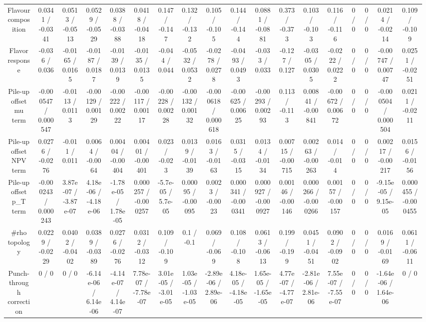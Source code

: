 \documentclass[10pt]{article}
\begin{document}
\begin{table}[htbp]
\begin{center}
\begin{tabular}{|c|c|c|c|c|c|c|c|c|c|c|c|c|c|c|c|c|c|}
  Flavour composition & 0.0341 / -0.0341 & 0.0513 / -0.0513 & 0.0529 / -0.0529 & 0.0388 / -0.0388 & 0.0418 / -0.0418 & 0.147 / -0.147 & 0.132 / -0.132 & 0.105 / -0.105 & 0.144 / -0.144 & 0.0881 / -0.0881 & 0.373 / -0.373 & 0.103 / -0.103 & 0.116 / -0.116 & 0 / 0 & 0 / 0 & 0.0214 / -0.0214 & 0.109 / -0.109 \\ 
  Flavor response & -0.036 / 0.036 & -0.0165 / 0.0165 & -0.0187 / 0.0187 & -0.0139 / 0.0139 & -0.0135 / 0.0135 & -0.044 / 0.044 & -0.0532 / 0.0532 & -0.0278 / 0.0278 & -0.0493 / 0.0493 & -0.033 / 0.033 & -0.127 / 0.127 & -0.0305 / 0.0305 & -0.0222 / 0.0222 & 0 / 0 & 0 / 0 & -0.00747 / 0.00747 & 0.0251 / -0.0251 \\ 
  Pile-up offset mu term & -0.000547 / 0.000547 & -0.0113 / 0.0113 & -0.00129 / 0.00129 & -0.00222 / 0.00222 & -0.00117 / 0.00117 & -0.00228 / 0.00228 & -0.00132 / 0.00132 & -0.000618 / 0.000618 & -0.00625 / 0.00625 & -0.00293 / 0.00293 & 0.113 / -0.113 & 0.00841 / -0.00841 & -0.00672 / 0.00672 & 0 / 0 & 0 / 0 & -0.000504 / 0.000504 & 0.0211 / -0.0211 \\ 
  Pile-up offset NPV term & 0.0276 / -0.0276 & -0.011 / 0.011 & 0.0064 / -0.0064 & 0.00404 / -0.00404 & 0.00401 / -0.00401 & 0.023 / -0.023 & 0.0139 / -0.0139 & 0.0163 / -0.0163 & 0.0315 / -0.0315 & 0.0134 / -0.0134 & 0.00715 / -0.00715 & 0.00263 / -0.00263 & 0.014 / -0.014 & 0 / 0 & 0 / 0 & 0.00217 / -0.00217 & 0.0156 / -0.0156 \\ 
  Pile-up offset p_{T} term & -0.000243 / 0.000243 & 3.87e-07 / -3.87e-07 & 4.18e-06 / -4.18e-06 & -1.78e-05 / 1.78e-05 & 0.000257 / -0.000257 & -5.7e-05 / 5.7e-05 & 0.00095 / -0.00095 & 0.0023 / -0.0023 & 0.000341 / -0.000341 & 0.000927 / -0.000927 & 0.00146 / -0.00146 & 0.000266 / -0.000266 & 0.00157 / -0.00157 & 0 / 0 & 0 / 0 & -9.15e-05 / 9.15e-05 & 0.000455 / -0.000455 \\ 
  #rho topology & 0.0229 / -0.0229 & 0.0402 / -0.0402 & 0.0389 / -0.0389 & 0.0276 / -0.0276 & 0.0312 / -0.0312 & 0.109 / -0.109 & 0.1 / -0.1 & 0.069 / -0.069 & 0.108 / -0.108 & 0.0613 / -0.0613 & 0.199 / -0.199 & 0.0451 / -0.0451 & 0.0902 / -0.0902 & 0 / 0 & 0 / 0 & 0.0169 / -0.0169 & 0.0611 / -0.0611 \\ 
  Punch-through correction & 0 / 0 & 0 / 0 & -6.14e-06 / 6.14e-06 & -4.14e-07 / 4.14e-07 & 7.78e-07 / -7.78e-07 & 3.01e-05 / -3.01e-05 & 1.03e-05 / -1.03e-05 & -2.89e-06 / 2.89e-06 & 4.18e-05 / -4.18e-05 & 1.65e-05 / -1.65e-05 & 4.77e-07 / -4.77e-07 & -2.81e-06 / 2.81e-06 & 7.55e-07 / -7.55e-07 & 0 / 0 & 0 / 0 & -1.64e-06 / 1.64e-06 & 0 / 0 \\ 

\end{tabular}
\end{center}
\end{table}
\end{document}
